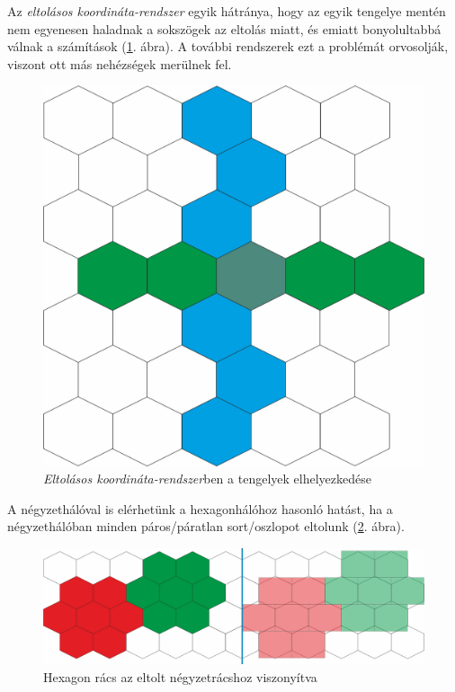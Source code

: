 Az \textit{eltolásos koordináta-rendszer} egyik hátránya, hogy az egyik tengelye mentén nem egyenesen haladnak a sokszögek az eltolás miatt, és emiatt bonyolultabbá válnak a számítások (\ref{fig:OffsetCoord}. ábra). A további rendszerek ezt a problémát orvosolják, viszont ott más nehézségek merülnek fel.	

\begin{figure}[h!]
\centering
\includegraphics[scale=0.2]{kepek/OffsetCoord.jpg}
\caption{\textit{Eltolásos koordináta-rendszer}ben a tengelyek elhelyezkedése}
\label{fig:OffsetCoord}
\end{figure}

A négyzethálóval is elérhetünk a hexagonhálóhoz hasonló hatást, ha a négyzethálóban minden páros/páratlan sort/oszlopot eltolunk (\ref{fig:Hex_Sq}. ábra).

\begin{figure}[h!]
\centering
\includegraphics[scale=0.25]{kepek/Hex_Sq.jpg}
\caption{Hexagon rács az eltolt négyzetrácshoz viszonyítva}
\label{fig:Hex_Sq}
\end{figure}

